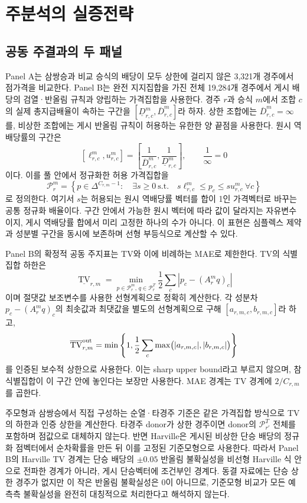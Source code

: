 \section{주분석의 실증전략}

\subsection{공동 주결과의 두 패널}
\label{subsec:co-primary-panels}

Panel A는 삼쌍승과 비교 승식의 배당이 모두 상한에 걸리지 않은 3,321개 경주에서
점가격을 비교한다. Panel B는 완전 지지집합을 가진 전체 19,284개 경주에서
게시 배당의 검열·반올림 규칙과 양립하는 가격집합을 사용한다. 경주 $r$과 승식
$m$에서 조합 $c$의 실제 총지급배율이 속하는 구간을
$[\underline D^m_{r,c},\overline D^m_{r,c}]$라 하자. 상한 조합에는
$\overline D^m_{r,c}=\infty$를, 비상한 조합에는 게시 반올림 규칙이 허용하는
유한한 양 끝점을 사용한다. 원시 역배당률의 구간은
\[
  [\ell^m_{r,c},u^m_{r,c}]
  =\left[\frac{1}{\overline D^m_{r,c}},
          \frac{1}{\underline D^m_{r,c}}\right],
  \qquad \frac{1}{\infty}=0
\]
이다. 이를 풀 안에서 정규화한 허용 가격집합을
\begin{equation}
  \mathcal P^m_r
  =\left\{p\in\Delta^{C_{r,m}-1}:\quad
    \exists s\ge 0\ \text{s.t.}\quad
    s\ell^m_{r,c}\le p_c\le su^m_{r,c}\ \forall c\right\}
  \label{eq:interval-price-set}
\end{equation}
로 정의한다. 여기서 $s$는 허용되는 원시 역배당률 벡터를 합이 1인 가격벡터로
바꾸는 공통 정규화 배율이다. 구간 안에서 가능한 원시 벡터에 따라 값이 달라지는
자유변수이지, 게시 역배당률 합에서 미리 고정한 하나의 수가 아니다. 이 표현은
심플렉스 제약과 성분별 구간을 동시에 보존하며 선형 부등식으로 계산할 수 있다.

Panel B의 확정적 공동 주지표는 TV와 이에 비례하는 MAE로 제한한다. TV의
식별집합 하한은
\[
  \underline{\operatorname{TV}}_{r,m}
  =\min_{p\in\mathcal P^m_r,\,q\in\mathcal P^T_r}
    \frac12\sum_c\left|p_c-(A^m_rq)_c\right|
\]
이며 절댓값 보조변수를 사용한 선형계획으로 정확히 계산한다. 각 성분차
$p_c-(A^m_rq)_c$의 최솟값과 최댓값을 별도의 선형계획으로 구해
$[a_{r,m,c},b_{r,m,c}]$라 하고,
\[
  \overline{\operatorname{TV}}^{\rm out}_{r,m}
  =\min\left\{1,\frac12\sum_c
    \max\bigl(|a_{r,m,c}|,|b_{r,m,c}|\bigr)\right\}
\]
를 인증된 보수적 상한으로 사용한다. 이는 sharp upper bound라고 부르지 않으며,
참 식별집합이 이 구간 안에 놓인다는 보장만 사용한다. MAE 경계는 TV 경계에
$2/C_{r,m}$를 곱한다.

주모형과 삼쌍승에서 직접 구성하는 순열·타경주 기준은 같은 가격집합 방식으로
TV의 하한과 인증 상한을 계산한다. 타경주 donor가 상한 경주이면 donor의
$\mathcal P^T_{r'}$ 전체를 포함하며 점값으로 대체하지 않는다. 반면 Harville은
게시된 비상한 단승 배당의 정규화 점벡터에서 순차확률을 만든 뒤 이를 고정된
기준모형으로 사용한다. 따라서 Panel B의 Harville TV 경계는 단승 배당의
$\pm0.05$ 반올림 불확실성을 비선형 Harville 식 안으로 전파한 경계가 아니라,
게시 단승벡터에 조건부인 경계다. 동결 자료에는 단승 상한 경주가 없지만 이 작은
반올림 불확실성은 0이 아니므로, 기준모형 비교가 모든 예측측 불확실성을 완전히
대칭적으로 처리한다고 해석하지 않는다.

